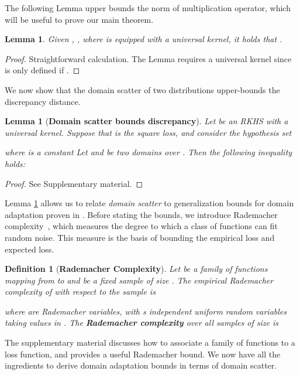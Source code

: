 \documentclass[10pt,journal,compsoc]{IEEEtran}
\newtheorem{lem}[thm]{Lemma}
\newtheorem{defn}{Definition}
\begin{document}
The following Lemma upper bounds the norm of multiplication operator, which will be useful to prove our main theorem.
 \begin{lem}\label{lem:mult}
   Given , , where  is equipped with a universal kernel, it holds that
   .
 \end{lem}
 \begin{proof}
    Straightforward calculation. The Lemma requires a universal kernel since  is only defined if .
 \end{proof}


We now show that the domain scatter of two distributions upper-bounds the discrepancy distance.
\begin{lem}[\textbf{Domain scatter bounds discrepancy}]
\label{t:disc_scatter}
  Let  be an RKHS with a universal kernel.
  Suppose that  is the square loss, and consider the hypothesis set

where  is a constant
Let  and  be two domains over . 
Then the following inequality holds:	

\end{lem}

\begin{proof} 
See Supplementary material. 
\end{proof}

Lemma \ref{t:disc_scatter} allows us to relate \emph{domain scatter} to generalization bounds for domain adaptation proven in \cite{Mansour2009}. 
Before stating the bounds, we introduce Rademacher complexity~\cite{Bartlett:2002}, which measures the degree to which a class of functions can fit random noise.
This measure is the basis of bounding the empirical loss and expected loss.

\begin{defn}[\textbf{Rademacher Complexity}]
\label{d:radem}
Let  be a family of functions mapping from  to  and  be a fixed sample of size .
The empirical Rademacher complexity of  with respect to the sample  is

where  are Rademacher variables, with s independent uniform random variables taking values in .
The \textbf{Rademacher complexity} over all samples of size  is

 
\end{defn}

The supplementary material discusses how to associate a family of functions to a loss function, and provides a useful Rademacher bound.  We now have all the ingredients to derive domain adaptation bounds in terms of domain scatter.
\end{document}
